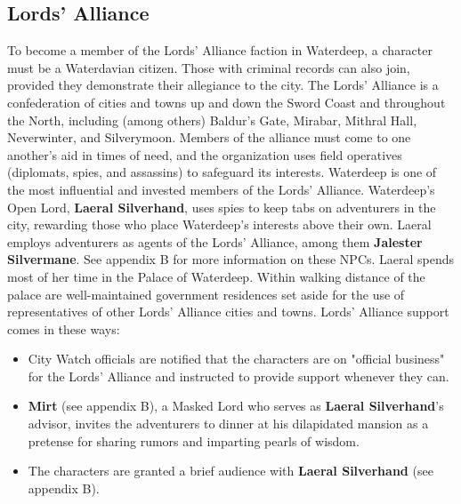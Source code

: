 \documentclass[10pt,a4paper,twoside,twocolumn,openany,nodeprecatedcode]{dndbook}
\begin{document}
\subsection{Lords' Alliance}
To become a member of the Lords' Alliance faction in Waterdeep, a character must be a Waterdavian citizen. Those with criminal records can also join, provided they demonstrate their allegiance to the city.
The Lords' Alliance is a confederation of cities and towns up and down the Sword Coast and throughout the North, including (among others) Baldur's Gate, Mirabar, Mithral Hall, Neverwinter, and Silverymoon. Members of the alliance must come to one another's aid in times of need, and the organization uses field operatives (diplomats, spies, and assassins) to safeguard its interests.
Waterdeep is one of the most influential and invested members of the Lords' Alliance. Waterdeep's Open Lord, \textbf{Laeral Silverhand}, uses spies to keep tabs on adventurers in the city, rewarding those who place Waterdeep's interests above their own. Laeral employs adventurers as agents of the Lords' Alliance, among them \textbf{Jalester Silvermane}. See appendix B for more information on these NPCs.
Laeral spends most of her time in the Palace of Waterdeep. Within walking distance of the palace are well-maintained government residences set aside for the use of representatives of other Lords' Alliance cities and towns.
Lords' Alliance support comes in these ways:
\begin{itemize}

\item City Watch officials are notified that the characters are on "official business" for the Lords' Alliance and instructed to provide support whenever they can.
\item \textbf{Mirt} (see appendix B), a Masked Lord who serves as \textbf{Laeral Silverhand}'s advisor, invites the adventurers to dinner at his dilapidated mansion as a pretense for sharing rumors and imparting pearls of wisdom.
\item The characters are granted a brief audience with \textbf{Laeral Silverhand} (see appendix B).
\end{itemize}
\end{document}

